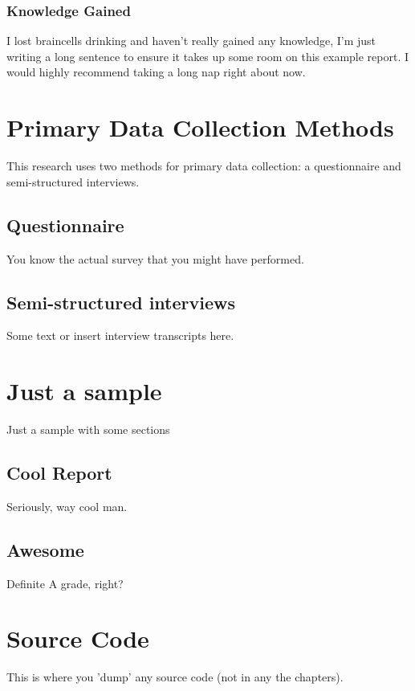 \documentclass[final,a4paper,11pt]{report}
\begin{document}
\subsection{Knowledge Gained}
I lost braincells drinking and haven't really gained any knowledge, I'm just writing a long sentence to ensure it takes up some room on this example report. I would highly recommend taking a long nap right about now.

\clearpage






\appendix


\chapter{Primary Data Collection Methods}\label{appendix:data_collection}
This research uses two methods for primary data collection: a questionnaire and semi-structured interviews.

\section{Questionnaire}
You know the actual survey that you might have performed.

\section{Semi-structured interviews}
Some text or insert interview transcripts here.

\chapter{Just a sample}\label{appendix:sample}
Just a sample with some sections

\section{Cool Report}
Seriously, way cool man.

\section{Awesome}
Definite A grade, right?


\chapter{Source Code}
This is where you 'dump' any source code (not in any the chapters).


\end{document}
